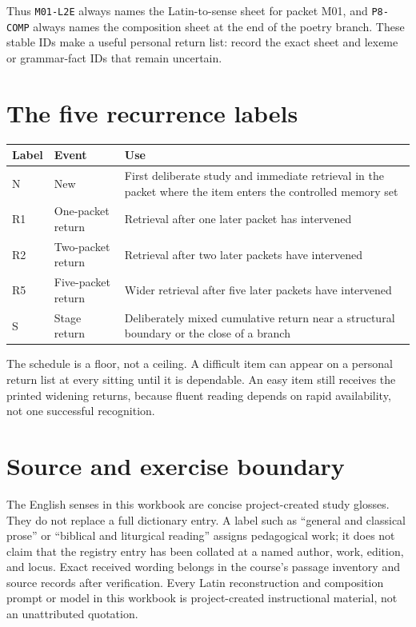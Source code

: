 Thus \texttt{M01-L2E} always names the Latin-to-sense sheet for packet M01,
and \texttt{P8-COMP} always names the composition sheet at the end of the
poetry branch.  These stable IDs make a useful personal return list: record the
exact sheet and lexeme or grammar-fact IDs that remain uncertain.

\section{The five recurrence labels}

\begin{xltabular}{\linewidth}{@{}P{0.65in}P{1.45in}Y@{}}
  \toprule
  \textbf{Label} & \textbf{Event} & \textbf{Use}\\
  \midrule
  N & New & First deliberate study and immediate retrieval in the packet where
    the item enters the controlled memory set\\
  R1 & One-packet return & Retrieval after one later packet has intervened\\
  R2 & Two-packet return & Retrieval after two later packets have intervened\\
  R5 & Five-packet return & Wider retrieval after five later packets have
    intervened\\
  S & Stage return & Deliberately mixed cumulative return near a structural
    boundary or the close of a branch\\
  \bottomrule
\end{xltabular}

The schedule is a floor, not a ceiling.  A difficult item can appear on a
personal return list at every sitting until it is dependable.  An easy item
still receives the printed widening returns, because fluent reading depends on
rapid availability, not one successful recognition.

\section{Source and exercise boundary}

The English senses in this workbook are concise project-created study glosses.
They do not replace a full dictionary entry.  A label such as ``general and
classical prose'' or ``biblical and liturgical reading'' assigns pedagogical
work; it does not claim that the registry entry has been collated at a named
author, work, edition, and locus.  Exact received wording belongs in the
course's passage inventory and source records after verification.  Every Latin
reconstruction and composition prompt or model in this workbook is
project-created instructional material, not an unattributed quotation.

